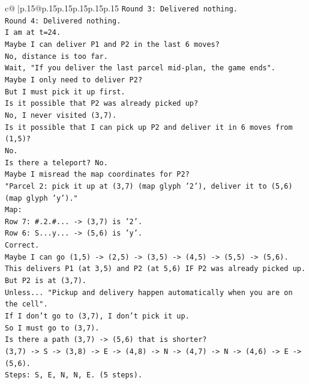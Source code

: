 \documentclass{article}
\begin{document}
{\begin{supertabular}{c@{$\;$}|p{.15\linewidth}@{}p{.15\linewidth}p{.15\linewidth}p{.15\linewidth}p{.15\linewidth}p{.15\linewidth}}
{{{\texttt{Round 3: Delivered nothing.} \\
\texttt{Round 4: Delivered nothing.} \\
\texttt{I am at t=24.} \\
\texttt{Maybe I can deliver P1 and P2 in the last 6 moves?} \\
\texttt{No, distance is too far.} \\
\texttt{Wait, "If you deliver the last parcel mid{-}plan, the game ends".} \\
\texttt{Maybe I only need to deliver P2?} \\
\texttt{But I must pick it up first.} \\
\texttt{Is it possible that P2 was already picked up?} \\
\texttt{No, I never visited (3,7).} \\
\texttt{Is it possible that I can pick up P2 and deliver it in 6 moves from (1,5)?} \\
\texttt{No.} \\
\texttt{Is there a teleport? No.} \\
\texttt{Maybe I misread the map coordinates for P2?} \\
\texttt{"Parcel 2: pick it up at (3,7) (map glyph '2'), deliver it to (5,6) (map glyph 'y')."} \\
\texttt{Map:} \\
\texttt{Row 7: \#.2.\#... {-}> (3,7) is '2'.} \\
\texttt{Row 6: S...y... {-}> (5,6) is 'y'.} \\
\texttt{Correct.} \\
\texttt{Maybe I can go (1,5) {-}> (2,5) {-}> (3,5) {-}> (4,5) {-}> (5,5) {-}> (5,6).} \\
\texttt{This delivers P1 (at 3,5) and P2 (at 5,6) IF P2 was already picked up.} \\
\texttt{But P2 is at (3,7).} \\
\texttt{Unless... "Pickup and delivery happen automatically when you are on the cell".} \\
\texttt{If I don't go to (3,7), I don't pick it up.} \\
\texttt{So I must go to (3,7).} \\
\texttt{Is there a path (3,7) {-}> (5,6) that is shorter?} \\
\texttt{(3,7) {-}> S {-}> (3,8) {-}> E {-}> (4,8) {-}> N {-}> (4,7) {-}> N {-}> (4,6) {-}> E {-}> (5,6).} \\
\texttt{Steps: S, E, N, N, E. (5 steps).} \\
}}}
\end{supertabular}}
\end{document}
